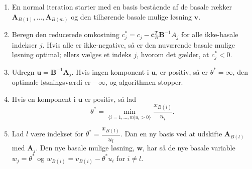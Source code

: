 \begin{tcolorbox}[
title=Den naive implementering,
colback		= myblue!15,
colframe	= myblue!15,
coltitle	= black,
before skip	= 20pt plus 2pt,
after skip	= 20pt plus 2pt,
fonttitle	= \bfseries]
\begin{enumerate}
\item En normal iteration starter med en basis bestående af de basale rækker $\textbf{A}_{B(1)},\ldots,\textbf{A}_{B(m)}$ og den tilhørende basale mulige løsning $\textbf{v}$.
\item Beregn den reducerede omkostning $c_j^* = c_j - \mathbf{c}_B^T \textbf{B}^{-1}A_j$ for alle ikke-basale indekser $j$.
Hvis alle er ikke-negative, så er den nuværende basale mulige løsning optimal; ellers vælges et indeks $j$, hvorom det gælder, at $c^*_j<0.$
\item Udregn $\textbf{u}=\textbf{B}^{-1}\textbf{A}_j$.
Hvis ingen komponent i $\textbf{u}$, er positiv, så er $\theta ^*=\infty$, den optimale løsningsværdi er $-\infty$, og algorithmen stopper.
\item Hvis en komponent i $\textbf{u}$ er positiv, så lad 
$$\theta^*= \min_{ \{i=1,\ldots,m|u_i>0 \} }        \dfrac{x_{B(i)}}{u_i}.$$
\item Lad $l$ være indekset for $\theta^*=  \dfrac{x_{B(l)}}{u_l}$.
Dan en ny basis ved at udskifte $\textbf{A}_{B(l)}$ med $\textbf{A}_j$.
Den nye basale mulige løsning, $\textbf{w}$, har så de nye basale variable $w_j=\theta^*$ og $w_{B(i)}=v_{B(i)}-\theta^*u_i$ for $i\neq l.$
\end{enumerate}
\end{tcolorbox}
%
